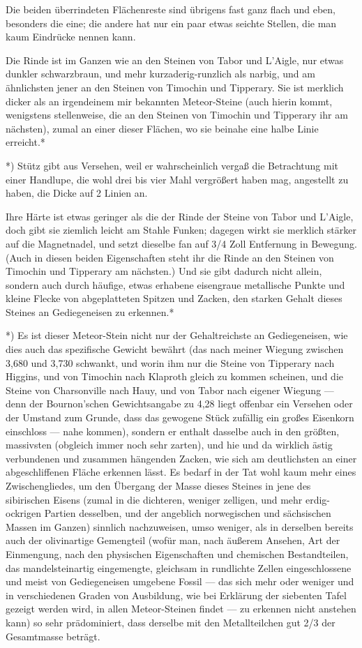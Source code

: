 \documentclass[a4paper, 11pt, oneside, german]{article}
\begin{document}
Die beiden überrindeten Flächenreste sind übrigens fast ganz flach und eben, besonders die eine; die andere hat nur ein paar etwas seichte Stellen, die man kaum Eindrücke nennen kann.

Die Rinde ist im Ganzen wie an den Steinen von Tabor und L'Aigle, nur etwas dunkler schwarzbraun, und mehr kurzaderig-runzlich als narbig, und am ähnlichsten jener an den Steinen von Timochin und Tipperary. Sie ist merklich dicker als an irgendeinem mir bekannten Meteor-Steine (auch hierin kommt, wenigstens stellenweise, die an den Steinen von Timochin und Tipperary ihr am nächsten), zumal an einer dieser Flächen, wo sie beinahe eine halbe Linie erreicht.*

*) Stütz gibt aus Versehen, weil er wahrscheinlich vergaß die Betrachtung mit einer Handlupe, die wohl drei bis vier Mahl vergrößert haben mag, angestellt zu haben, die Dicke auf 2 Linien an.

Ihre Härte ist etwas geringer als die der Rinde der Steine von Tabor und L'Aigle, doch gibt sie ziemlich leicht am Stahle Funken; dagegen wirkt sie merklich stärker auf die Magnetnadel, und setzt dieselbe fan auf 3/4 Zoll Entfernung in Bewegung. (Auch in diesen beiden Eigenschaften steht ihr die Rinde an den Steinen von Timochin und Tipperary am nächsten.) Und sie gibt dadurch nicht allein, sondern auch durch häufige, etwas erhabene eisengraue metallische Punkte und kleine Flecke von abgeplatteten Spitzen und Zacken, den starken Gehalt dieses Steines an Gediegeneisen zu erkennen.*

*) Es ist dieser Meteor-Stein nicht nur der Gehaltreichste an Gediegeneisen, wie dies auch das spezifische Gewicht bewährt (das nach meiner Wiegung zwischen 3,680 und 3,730 schwankt, und worin ihm nur die Steine von Tipperary nach Higgins, und von Timochin nach Klaproth gleich zu kommen scheinen, und die Steine von Charsonville nach Hauy, und von Tabor nach eigener Wiegung --- denn der Bournon'schen Gewichtsangabe zu 4,28 liegt offenbar ein Versehen oder der Umstand zum Grunde, dass das gewogene Stück zufällig ein großes Eisenkorn einschloss --- nahe kommen), sondern er enthalt dasselbe auch in den größten, massivsten (obgleich immer noch sehr zarten), und hie und da wirklich ästig verbundenen und zusammen hängenden Zacken, wie sich am deutlichsten an einer abgeschliffenen Fläche erkennen lässt. Es bedarf in der Tat wohl kaum mehr eines Zwischengliedes, um den Übergang der Masse dieses Steines in jene des sibirischen Eisens (zumal in die dichteren, weniger zelligen, und mehr erdig-ockrigen Partien desselben, und der angeblich norwegischen und sächsischen Massen im Ganzen) sinnlich nachzuweisen, umso weniger, als in derselben bereits auch der olivinartige Gemengteil (wofür man, nach äußerem Ansehen, Art der Einmengung, nach den physischen Eigenschaften und chemischen Bestandteilen, das mandelsteinartig eingemengte, gleichsam in rundlichte Zellen eingeschlossene und meist von Gediegeneisen umgebene Fossil --- das sich mehr oder weniger und in verschiedenen Graden von Ausbildung, wie bei Erklärung der siebenten Tafel gezeigt werden wird, in allen Meteor-Steinen findet --- zu erkennen nicht anstehen kann) so sehr prädominiert, dass derselbe mit den Metallteilchen gut 2/3 der Gesamtmasse beträgt.
\end{document}
